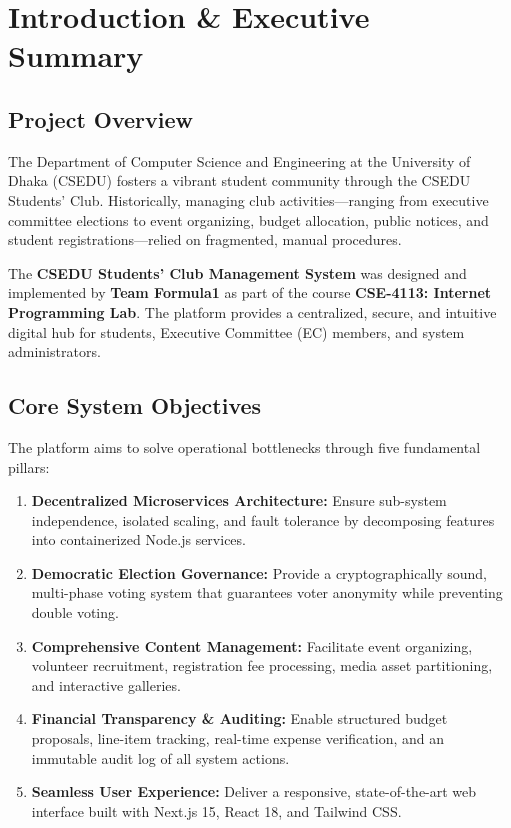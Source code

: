 \documentclass[12pt, a4paper]{report}
\begin{document}
\cleardoublepage


\chapter{Introduction \& Executive Summary}

\section{Project Overview}
The Department of Computer Science and Engineering at the University of Dhaka (CSEDU) fosters a vibrant student community through the CSEDU Students' Club. Historically, managing club activities---ranging from executive committee elections to event organizing, budget allocation, public notices, and student registrations---relied on fragmented, manual procedures. 

The \textbf{CSEDU Students' Club Management System} was designed and implemented by \textbf{Team Formula1} as part of the course \textbf{CSE-4113: Internet Programming Lab}. The platform provides a centralized, secure, and intuitive digital hub for students, Executive Committee (EC) members, and system administrators.

\section{Core System Objectives}
The platform aims to solve operational bottlenecks through five fundamental pillars:
\begin{enumerate}[label=\bfseries P\arabic*.]
    \item \textbf{Decentralized Microservices Architecture:} Ensure sub-system independence, isolated scaling, and fault tolerance by decomposing features into containerized Node.js services.
    \item \textbf{Democratic Election Governance:} Provide a cryptographically sound, multi-phase voting system that guarantees voter anonymity while preventing double voting.
    \item \textbf{Comprehensive Content Management:} Facilitate event organizing, volunteer recruitment, registration fee processing, media asset partitioning, and interactive galleries.
    \item \textbf{Financial Transparency \& Auditing:} Enable structured budget proposals, line-item tracking, real-time expense verification, and an immutable audit log of all system actions.
    \item \textbf{Seamless User Experience:} Deliver a responsive, state-of-the-art web interface built with Next.js 15, React 18, and Tailwind CSS.
\end{enumerate}
\end{document}
